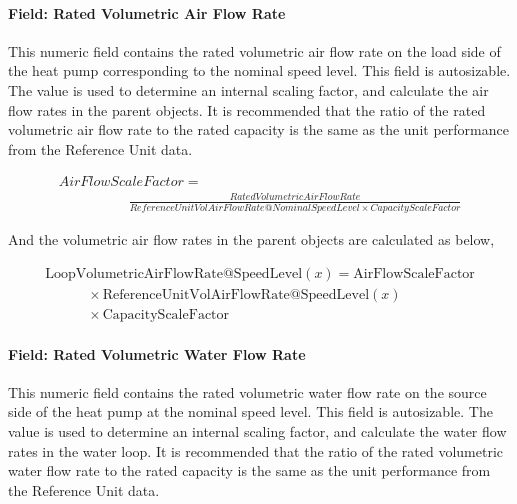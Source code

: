\paragraph{Field: Rated Volumetric Air Flow Rate}\label{field-rated-volumetric-air-flow-rate-1}

This numeric field contains the rated volumetric air flow rate on the load side of the heat pump corresponding to the nominal speed level. This field is autosizable. The value is used to determine an internal scaling factor, and calculate the air flow rates in the parent objects. It is recommended that the ratio of the rated volumetric air flow rate to the rated capacity is the same as the unit performance from the Reference Unit data.

\begin{equation}
  \begin{array}{l}
    AirFlowScaleFactor = \\\quad \quad \quad \quad \quad \frac{{RatedVolumetricAirFlowRate}}{{ReferenceUnitVolAirFlowRate@NominalSpeedLevel \times CapacityScaleFactor}}
  \end{array}
\end{equation}

And the volumetric air flow rates in the parent objects are calculated as below,

\begin{equation}
  \begin{array}{l}
    \mathrm{LoopVolumetricAirFlowRate} @ \mathrm{SpeedLevel} \left( x \right) = \mathrm{AirFlowScaleFactor} \\
    \quad \quad \quad \times \mathrm{ReferenceUnitVolAirFlowRate} @ \mathrm{SpeedLevel}(x) \\
    \quad \quad \quad \times \mathrm{CapacityScaleFactor}
  \end{array}
\end{equation}



\paragraph{Field: Rated Volumetric Water Flow Rate}\label{field-rated-volumetric-water-flow-rate}

This numeric field contains the rated volumetric water flow rate on the source side of the heat pump at the nominal speed level. This field is autosizable. The value is used to determine an internal scaling factor, and calculate the water flow rates in the water loop. It is recommended that the ratio of the rated volumetric water flow rate to the rated capacity is the same as the unit performance from the Reference Unit data.

